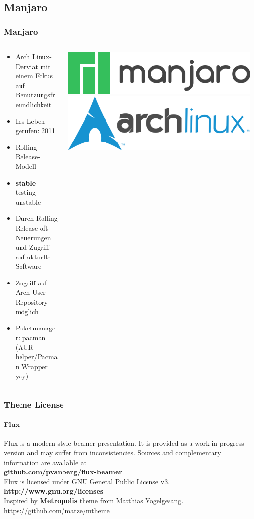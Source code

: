 \documentclass[9pt]{beamer}
\begin{document}
\subsection{Manjaro}
\begin{frame}
 \frametitle{Manjaro}
 \begin{columns} 
    \begin{column}[c]{0.6\textwidth}

	\begin{itemize}
		\item Arch Linux-Derviat mit einem Fokus auf Benutzungsfreundlichkeit
		\item Ins Leben gerufen: 2011
		\item Rolling-Release-Modell
		\item \textbf{stable} -- testing -- unstable
		\item Durch Rolling Release oft Neuerungen und Zugriff auf aktuelle Software
		\item Zugriff auf Arch User Repository möglich
		\item Paketmanager: pacman (AUR helper/Pacman Wrapper yay)
	\end{itemize}
	\end{column}
	
	\begin{column}{0.4\textwidth}
    \includegraphics[width=1.0\textwidth]{assets/manjaro.png}
    \includegraphics[width=1.0\textwidth]{assets/arch.png} 
	\end{column}

 \end{columns}
\end{frame}


\begin{frame}
 \centering
 \frametitle{Theme License}
 \framesubtitle{Flux}
 	\justifying
 Flux is a modern style beamer presentation. It is provided as a work in progress version and may suffer from inconsistencies. Sources and complementary information are available at\\[0.3cm]
 	\centering\textbf{github.com/pvanberg/flux-beamer}\\
 Flux is licensed under GNU General Public License v3.\\[0.3cm]
 	\centering\textbf{http://www.gnu.org/licenses}\\[0.3cm]
Inspired by \textbf{Metropolis} theme from Matthias Vogelgesang.\\
https://github.com/matze/mtheme 
 
\end{frame}
\end{document}
